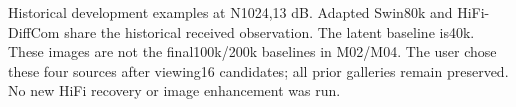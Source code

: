 Historical development examples at N1024,13 dB. Adapted Swin80k and HiFi-DiffCom share the historical received observation. The latent baseline is40k. These images are not the final100k/200k baselines in M02/M04. The user chose these four sources after viewing16 candidates; all prior galleries remain preserved. No new HiFi recovery or image enhancement was run.
